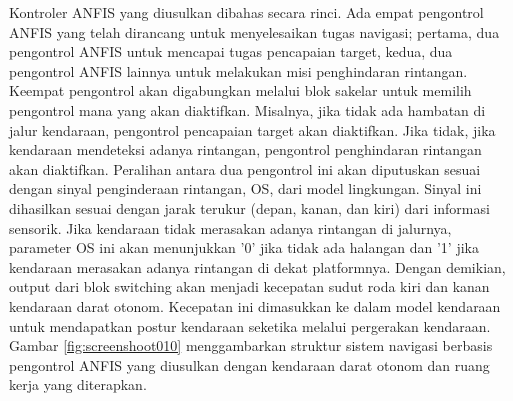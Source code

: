 
Kontroler ANFIS yang diusulkan dibahas secara rinci. Ada empat pengontrol ANFIS yang telah dirancang untuk menyelesaikan tugas navigasi; pertama, dua pengontrol ANFIS untuk mencapai tugas pencapaian target, kedua, dua pengontrol ANFIS lainnya untuk melakukan misi penghindaran rintangan. Keempat pengontrol akan digabungkan melalui blok sakelar untuk memilih pengontrol mana yang akan
diaktifkan. Misalnya, jika tidak ada hambatan di jalur kendaraan, pengontrol pencapaian target akan diaktifkan. Jika tidak, jika kendaraan mendeteksi adanya rintangan, pengontrol penghindaran rintangan akan diaktifkan. Peralihan antara dua pengontrol ini akan diputuskan sesuai dengan sinyal penginderaan rintangan, OS, dari model lingkungan. Sinyal ini dihasilkan sesuai dengan jarak terukur (depan, kanan, dan kiri) dari informasi sensorik. Jika kendaraan tidak merasakan adanya rintangan di jalurnya, parameter OS ini akan menunjukkan '0' jika tidak ada halangan dan '1' jika kendaraan merasakan adanya rintangan di dekat platformnya. Dengan demikian, output dari blok switching akan menjadi kecepatan sudut roda kiri dan kanan kendaraan darat otonom. Kecepatan ini dimasukkan ke dalam model kendaraan untuk mendapatkan postur kendaraan seketika melalui pergerakan kendaraan. Gambar \ref*{fig:screenshoot010} menggambarkan struktur sistem navigasi berbasis pengontrol ANFIS yang diusulkan dengan kendaraan darat otonom dan ruang kerja yang diterapkan.

